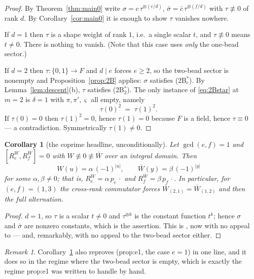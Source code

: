 \documentclass[11pt]{article}
\newtheorem{corollary}[theorem]{Corollary}
\theoremstyle{definition}
\theoremstyle{remark}
\newtheorem{remark}[theorem]{Remark}
\newcommand{\Mult}[1]{#1\,\cdot}
\begin{document}
\begin{proof}
By Theorem~\ref{thm:main0} write $\sigma=c\,\tau^{\otimes(e/d)}$,
$\bar\sigma=\bar c\,\tau^{\otimes(f/d)}$ with $\tau\not\equiv0$ of rank $d$.  By
Corollary~\ref{cor:main0} it is enough to show $\tau$ vanishes nowhere.

If $d=1$ then $\tau$ is a shape weight of rank $1$, i.e.\ a single scalar $t$, and
$\tau\not\equiv0$ means $t\ne0$.  There is nothing to vanish.  (Note that this case uses
\emph{only} the one-bead sector.)

If $d=2$ then $\tau:\{0,1\}\to F$ and $d\mid e$ forces $e\ge2$, so the two-bead sector is
nonempty and Proposition~\ref{prop:2B} applies: $\sigma$ satisfies (2B$^*_e$).  By
Lemma~\ref{lem:descent}(b), $\tau$ satisfies (2B$^*_2$).  The only instance of
\eqref{eq:2Bstar} at $m=2$ is $\delta=1$ with $\pi,\pi',\varsigma$ all empty, namely
\[
   \tau(0)^2\;=\;\tau(1)^2 .
\]
If $\tau(0)=0$ then $\tau(1)^2=0$, hence $\tau(1)=0$ because $F$ is a field, hence
$\tau\equiv0$ --- a contradiction.  Symmetrically $\tau(1)\ne0$.
\end{proof}

\begin{corollary}[the coprime headline, unconditionally]\label{cor:coprime}
Let $\gcd(e,f)=1$ and $[R_e^{W},R_f^{\bar W}]=0$ with $W\not\equiv0\not\equiv\bar W$ over an
integral domain.  Then
\[
   W(u)=\alpha\,(-1)^{|u|},\qquad \bar W(y)=\beta\,(-1)^{|y|}
\]
for some $\alpha,\beta\ne0$; that is, $R_e^{W}=\alpha\,\Mult{p_e}$ and
$R_f^{\bar W}=\beta\,\Mult{p_f}$.  In particular, for $(e,f)=(1,3)$ the cross-rank
commutator forces $\bar W_{(2,1)}=\bar W_{(1,2)}$ and then the full alternation.
\end{corollary}

\begin{proof}
$d=1$, so $\tau$ is a scalar $t\ne0$ and $\tau^{\otimes k}$ is the constant function $t^{k}$;
hence $\sigma$ and $\bar\sigma$ are nonzero constants, which is the assertion.  This is
\cite[Cor.~5.3]{Q149}, now with no appeal to \cite[Lemma 8.2]{Q149} --- and, remarkably, with
no appeal to the two-bead sector either.
\end{proof}

\begin{remark}
Corollary~\ref{cor:coprime} also reproves \cite[Prop.~8.5]{Q149} (\textsf{prop:e1}, the case
$e=1$) in one line, and it does so in the regime where the two-bead sector is empty, which is
exactly the regime \textsf{prop:e1} was written to handle by hand.
\end{remark}
\end{document}
